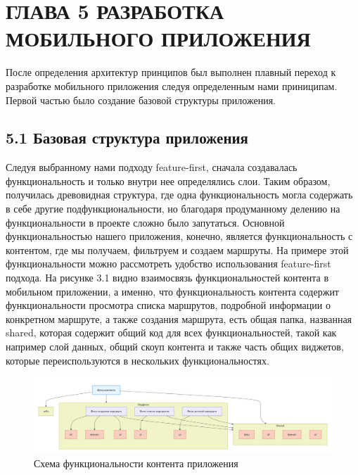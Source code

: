 \section{ГЛАВА 5 РАЗРАБОТКА МОБИЛЬНОГО ПРИЛОЖЕНИЯ}

После определения архитектур принципов был выполнен плавный переход к разработке мобильного приложения следуя определенным нами приниципам. 
Первой частью было создание базовой структуры приложения.

\subsection*{5.1 Базовая структура приложения}
Следуя выбранному нами подходу feature-first, сначала создавалась функциональность и только внутри нее определялись слои. Таким образом, получилась древовидная структура, где одна функциональность могла содержать в себе другие подфункциональности, но благодаря продуманному делению на функциональности в проекте сложно было запутаться. Основной функциональностью нашего приложения, конечно, является функциональность с контентом, где мы получаем, фильтруем и создаем маршруты. На примере этой функциональности можно рассмотреть удобство использования feature-first подхода. На рисунке 3.1 видно взаимосвязь функциональностей контента в мобильном приложении, а именно, что функциональность контента содержит функциональности просмотра списка маршрутов, подробной информации о конкретном маршруте, а также создания маршрута, есть общая папка, названная shared, которая содержит общий код для всех функциональностей, такой как например слой данных, общий скоуп контента и также часть общих виджетов, которые переиспользуются в нескольких функциональностях.

\begin{landscape}
\begin{figure}[H]
\centering
\includegraphics[height=0.4\textwidth]{Images/mobile_logic/структура_фичи.png}
\caption{Схема функциональности контента приложения}
\label{fig:feature_structure}
\end{figure}
\end{landscape}

